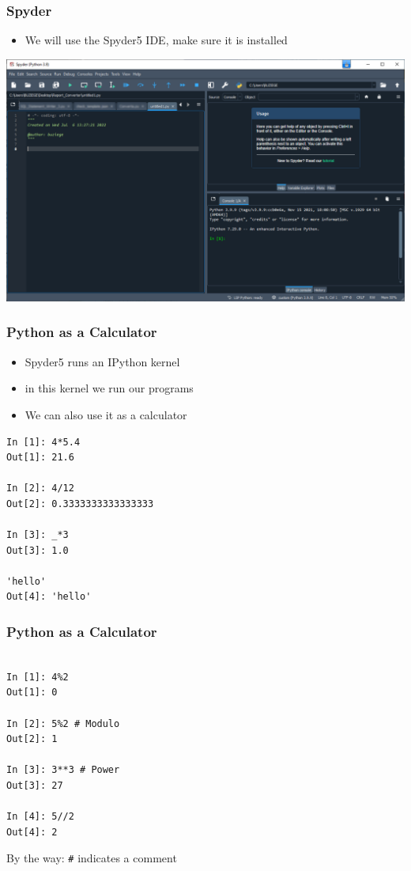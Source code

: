 \documentclass[english]{beamer}
\begin{document}
\begin{frame}
\frametitle{Spyder}

\begin{itemize}
	\item We will use the Spyder5 IDE, make sure it is installed
\end{itemize}

\begin{center}
\includegraphics[width=\textwidth]{Pictures/Spyder5}
\end{center}

\end{frame}

\begin{frame}[fragile]
\frametitle{Python as a Calculator}

\begin{itemize}
\item Spyder5 runs an IPython kernel
\item in this kernel we run our programs
\item We can also use it as a calculator
\end{itemize}

\begin{lstlisting}[style=Python]
In [1]: 4*5.4
Out[1]: 21.6

In [2]: 4/12
Out[2]: 0.3333333333333333

In [3]: _*3
Out[3]: 1.0

'hello'
Out[4]: 'hello'
\end{lstlisting}

\end{frame}


\begin{frame}[fragile]
\frametitle{Python as a Calculator}

\begin{lstlisting}[style=Python]

In [1]: 4%2
Out[1]: 0

In [2]: 5%2 # Modulo
Out[2]: 1

In [3]: 3**3 # Power
Out[3]: 27

In [4]: 5//2
Out[4]: 2
\end{lstlisting}

By the way: \texttt{\#} indicates a comment

\end{frame}
\end{document}
